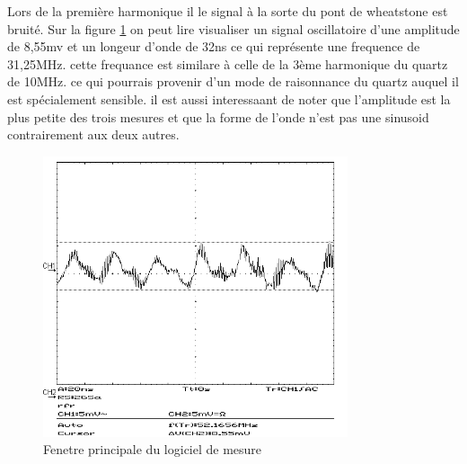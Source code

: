Lors de la première harmonique il le signal à la sorte du pont de wheatstone est bruité.
Sur la figure \ref{fig:10mhzbruit} on peut lire visualiser un signal oscillatoire d'une amplitude de 8,55mv et un longeur d'onde de 32ns ce qui représente une frequence de 31,25MHz.
cette frequance est similare à celle de la 3ème harmonique du quartz de 10MHz. ce qui pourrais provenir d'un mode de raisonnance du quartz auquel il est spécialement sensible. 
il est aussi interessaant de noter que l'amplitude est la plus petite des trois mesures et que la forme de l'onde n'est pas une sinusoid contrairement aux deux autres.
\begin{figure}[H]
    \centering
    \includegraphics[width=0.8\textwidth]{assets/figures/SCR00006.png}
    \caption{Fenetre principale du logiciel de mesure}
    \label{fig:10mhzbruit}
\end{figure}

